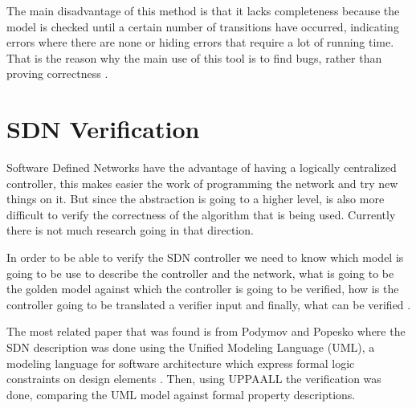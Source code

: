 The main disadvantage of this method is that it lacks completeness because the model is checked until a certain number of transitions have occurred, indicating errors where there are none or hiding errors that require a lot of running time. That is the reason why the main use of this tool is to find bugs, rather than proving correctness \cite{clarke2001bounded}. 


\section{SDN Verification}
%

Software Defined Networks have the advantage of having a logically centralized controller, this makes easier the work of programming the network and try new things on it. But since the abstraction is going to a higher level, is also more difficult to verify the correctness of the algorithm that is being used. Currently there is not much research going in that direction. 

In order to be able to verify the SDN controller we need to know which model is going to be use to describe the controller and the network, what is going to be the golden model against which the controller is going to be verified, how is the controller going to be translated a verifier input and finally, what can be verified \cite{podymov2013uppaal}. 

The most related paper that was found is from Podymov and Popesko \cite{podymov2013uppaal} where the SDN description was done using the Unified Modeling Language (UML), a modeling language for software architecture which express formal logic constraints on design elements \cite{medvidovic2002modeling}. Then, using UPPAALL \cite{larsen1997uppaal} the verification was done, comparing the UML model against formal property descriptions.

